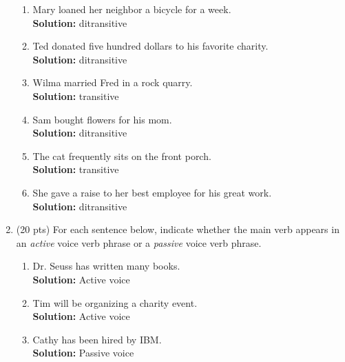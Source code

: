 \documentclass[11pt]{article}
\begin{document}
\begin{enumerate}
\begin{enumerate}
\item Mary loaned her neighbor a bicycle for a week.  \\
\textbf{Solution:} ditransitive\\

\item Ted donated five hundred dollars to his favorite charity. \\
\textbf{Solution:} ditransitive\\

\item Wilma married Fred in a rock quarry.  \\
\textbf{Solution:} transitive\\

\item Sam bought flowers for his mom. \\
\textbf{Solution:} ditransitive\\

\item The cat frequently sits on the front porch. \\
\textbf{Solution:} transitive\\

\item She gave a raise to her best employee for his great work.  \\
\textbf{Solution:} ditransitive\\

\end{enumerate}


\newpage
\item (20 pts) For each sentence below, indicate whether the main verb
  appears in an {\it active} voice verb phrase or a {\it passive}
  voice verb phrase. 

\begin{enumerate}

\item Dr. Seuss has written many books. \\
\textbf{Solution:} Active voice\\

\item Tim will be organizing a charity event. \\
\textbf{Solution:} Active voice\\

\item Cathy has been hired by IBM. \\
\textbf{Solution:} Passive voice\\


\end{enumerate}
\end{enumerate}
\end{document}
